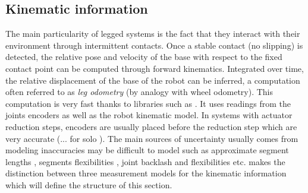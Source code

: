 \subsection{Kinematic information}
The main particularity of legged systems is the fact that they interact with their environment through intermittent contacts.
Once a stable contact (no slipping) is detected, the relative pose and velocity of the base with respect to the fixed contact point 
can be computed through forward kinematics. Integrated over time, the relative displacement of the base of the robot can be inferred, a computation 
often referred to as \textit{leg odometry} (by analogy with wheel odometry). This computation is very fast thanks to libraries such as \cite{carpentier2019pinocchio, hereid2017frost}. It uses
readings from the joints encoders as well as the robot kinematic model. In systems with actuator reduction steps, encoders are usually placed before the reduction step 
which are very accurate (... for solo \cite{grimminger2020open}). The main sources of uncertainty usually comes from
modeling inaccuracies may be difficult to model such as approximate segment lengths , segments flexibilities \cite{vigne2018estimation}, 
joint backlash \cite{fallon2014drift} and flexibilities \cite{koolen2016design} etc. 
\cite{bloesch2018technical} makes the distinction between three measurement models for the kinematic information which will define the structure of this section. 


